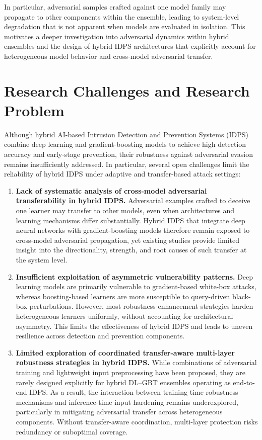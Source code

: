 \documentclass[12pt, a4paper, reqno, oneside]{book}
\newcommand \sect[1]{%
  \section*{#1}%
  \addcontentsline{toc}{section}{#1}}
\begin{document}
In particular, adversarial samples crafted against one model family may propagate to other components within the ensemble, leading to system-level degradation that is not apparent when models are evaluated in isolation. This motivates a deeper investigation into adversarial dynamics within hybrid ensembles and the design of hybrid IDPS architectures that explicitly account for heterogeneous model behavior and cross-model adversarial transfer.






\sect{Research Challenges and Research Problem}

Although hybrid AI-based Intrusion Detection and Prevention Systems (IDPS) combine deep learning and gradient-boosting models to achieve high detection accuracy and early-stage prevention, their robustness against adversarial evasion remains insufficiently addressed. In particular, several open challenges limit the reliability of hybrid IDPS under adaptive and transfer-based attack settings:

\begin{enumerate}
    \item \textbf{Lack of systematic analysis of cross-model adversarial transferability in hybrid IDPS.} 
    Adversarial examples crafted to deceive one learner may transfer to other models, even when architectures and learning mechanisms differ substantially. Hybrid IDPS that integrate deep neural networks with gradient-boosting models therefore remain exposed to cross-model adversarial propagation, yet existing studies provide limited insight into the directionality, strength, and root causes of such transfer at the system level.

    \item \textbf{Insufficient exploitation of asymmetric vulnerability patterns.} 
    Deep learning models are primarily vulnerable to gradient-based white-box attacks, whereas boosting-based learners are more susceptible to query-driven black-box perturbations. However, most robustness-enhancement strategies harden heterogeneous learners uniformly, without accounting for architectural asymmetry. This limits the effectiveness of hybrid IDPS and leads to uneven resilience across detection and prevention components.

    \item \textbf{Limited exploration of coordinated transfer-aware multi-layer robustness strategies in hybrid IDPS.} 
    While combinations of adversarial training and lightweight input preprocessing have been proposed, they are rarely designed explicitly for hybrid DL--GBT ensembles operating as end-to-end IDPS. As a result, the interaction between training-time robustness mechanisms and inference-time input hardening remains underexplored, particularly in mitigating adversarial transfer across heterogeneous components. Without transfer-aware coordination, multi-layer protection risks redundancy or suboptimal coverage.
\end{enumerate}
\end{document}
